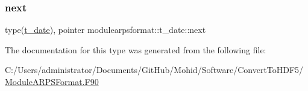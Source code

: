 \mbox{\label{structmodulearpsformat_1_1t__date_a417c5f6f3ee5646d7c42b45ccfef7af0}} 
\subsubsection{\texorpdfstring{next}{next}}
{\footnotesize\ttfamily type(\mbox{\hyperlink{structmodulearpsformat_1_1t__date}{t\+\_\+date}}), pointer modulearpsformat\+::t\+\_\+date\+::next\hspace{0.3cm}{\ttfamily [private]}}



The documentation for this type was generated from the following file\+:\begin{DoxyCompactItemize}
\item 
C\+:/\+Users/administrator/\+Documents/\+Git\+Hub/\+Mohid/\+Software/\+Convert\+To\+H\+D\+F5/\mbox{\hyperlink{_module_a_r_p_s_format_8_f90}{Module\+A\+R\+P\+S\+Format.\+F90}}\end{DoxyCompactItemize}
